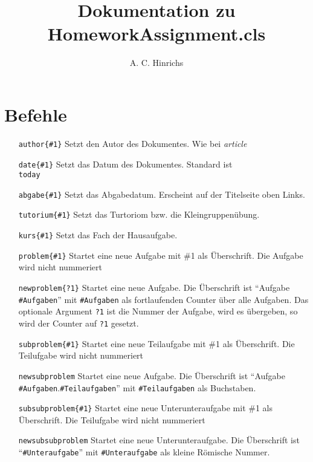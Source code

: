 \documentclass[a4papr]{article}
\title{Dokumentation zu HomeworkAssignment.cls}
\author{A. C. Hinrichs}
\begin{document}
\maketitle
\section{Befehle}
\begin{itemize}
 \item[\texttt{author\{\#1\}}]		Setzt den Autor des Dokumentes. Wie bei \textit{article}
 \item[\texttt{date\{\#1\}}]		Setzt das Datum des Dokumentes. Standard ist \texttt{\\today}
 \item[\texttt{abgabe\{\#1\}}]		Setzt das Abgabedatum. Erscheint auf der Titelseite oben Links.
 \item[\texttt{tutorium\{\#1\}}]	Setzt das Turtoriom bzw. die Kleingruppen\"ubung.	
 \item[\texttt{kurs\{\#1\}}]		Setzt das Fach der Hausaufgabe.	
 \item[\texttt{problem\{\#1\}}] 	Startet eine neue Aufgabe mit \#1 als \"Uberschrift.  Die Aufgabe wird nicht nummeriert
 \item[\texttt{newproblem\{?1\}}] 		Startet eine neue Aufgabe. Die \"Uberschrift ist \enquote{Aufgabe \texttt{\#Aufgaben}} mit \texttt{\#Aufgaben} als fortlaufenden Counter \"uber alle Aufgaben.  Das optionale Argument \texttt{?1} ist die Nummer der Aufgabe, wird es \"ubergeben, so wird der Counter auf \texttt{?1} gesetzt.  
 \item[\texttt{subproblem\{\#1\}}] 	Startet eine neue Teilaufgabe mit \#1 als \"Uberschrift.  Die Teilufgabe wird nicht nummeriert
 \item[\texttt{newsubproblem}] 		Startet eine neue Aufgabe. Die \"Uberschrift ist \enquote{Aufgabe \texttt{\#Aufgaben}.\texttt{\#Teilaufgaben}} mit \texttt{\#Teilaufgaben} als Buchstaben.
 \item[\texttt{subsubproblem\{\#1\}}] 	Startet eine neue Unterunteraufgabe mit \#1 als \"Uberschrift.  Die Teilufgabe wird nicht nummeriert
 \item[\texttt{newsubsubproblem}] 	Startet eine neue Unterunteraufgabe. Die \"Uberschrift ist \enquote{\texttt{\#Unteraufgabe}} mit \texttt{\#Unteraufgabe} als kleine R\"omische Nummer.
\end{itemize}
\end{document}
